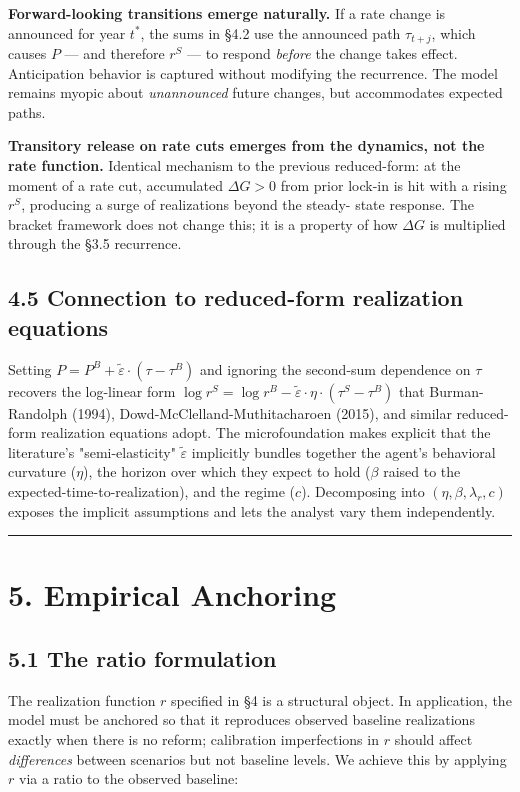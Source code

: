 \documentclass[11pt]{article}
\begin{document}
\textbf{Forward-looking transitions emerge naturally.} If a rate change is announced for year $t^*$, the sums in §4.2 use the announced path $\tau_{t+j}$, which causes $P$ — and therefore $r^S$ — to respond \emph{before} the change takes effect. Anticipation behavior is captured without modifying the recurrence. The model remains myopic about \emph{unannounced} future changes, but accommodates expected paths.

\textbf{Transitory release on rate cuts emerges from the dynamics, not the rate function.} Identical mechanism to the previous reduced-form: at the moment of a rate cut, accumulated $\Delta G > 0$ from prior lock-in is hit with a rising $r^S$, producing a surge of realizations beyond the steady- state response. The bracket framework does not change this; it is a property of how $\Delta G$ is multiplied through the §3.5 recurrence.

\subsection*{4.5 Connection to reduced-form realization equations}

Setting $P = P^B + \tilde\varepsilon \cdot (\tau - \tau^B)$ and ignoring the second-sum dependence on $\tau$ recovers the log-linear form $\log r^S = \log r^B - \tilde\varepsilon \cdot \eta \cdot (\tau^S - \tau^B)$ that Burman-Randolph (1994), Dowd-McClelland-Muthitacharoen (2015), and similar reduced-form realization equations adopt. The microfoundation makes explicit that the literature's "semi-elasticity" $\tilde\varepsilon$ implicitly bundles together the agent's behavioral curvature ($\eta$), the horizon over which they expect to hold ($\beta$ raised to the expected-time-to-realization), and the regime ($c$). Decomposing into $(\eta, \beta, \lambda_r, c)$ exposes the implicit assumptions and lets the analyst vary them independently.

\par\medskip\hrule\medskip

\section*{5. Empirical Anchoring}

\subsection*{5.1 The ratio formulation}

The realization function $r$ specified in §4 is a structural object. In application, the model must be anchored so that it reproduces observed baseline realizations exactly when there is no reform; calibration imperfections in $r$ should affect \emph{differences} between scenarios but not baseline levels. We achieve this by applying $r$ via a ratio to the observed baseline:
\end{document}
